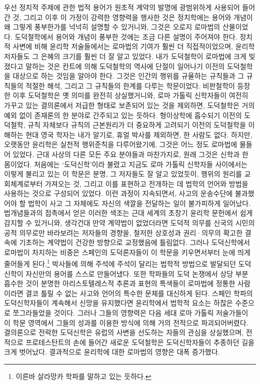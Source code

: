 우선
정치적 주제에 관한 법적 용어가
원초적 계약의 발명에
광범위하게 사용되어 들어간 것, 그리고
이후 이 가정이 강력한 영향력을 행사한 것은
정치학에는
용어와 개념이
왜 그렇게 풍부한가를 넉넉히 설명할 수 있거니와,
그것은 오로지 로마법의 산물이었다.
도덕철학에서 용어와 개념이 풍부한 것에는
조금 다른 설명이 주어져야 한다.
정치적 사변에 비해
윤리학 저술들에서는 로마법의 기여가
훨씬 더 직접적이었으며,
윤리학 저자들도
그 은혜의 크기를 훨씬 더 잘 알고 있었다.
내가 도덕철학이 로마법에 크게 빚졌다고 말하는 것은
칸트에 의해 도덕철학의 역사에 단절이 일어나기 이전의
도덕철학을 대상으로 하는 것임을 알아야 한다.
그것은 인간의 행위를 규율하는 규칙들과
그 규칙들의 적절한 해석,
그리고 그 규칙들의 한계를
다루는 학문이었다.
비판철학이 등장한 이후
도덕철학은 옛 의미를 완전히 상실했거니와,
로마 가톨릭 신학자들이 여전히 가꾸고 있는
결의론에서
저급한 형태로 보존되어 있는 것을 제외하면,
도덕철학은 거의 예외 없이 존재론의 한 분야로 간주되고 있는 듯하다.
형이상학에 흡수되기 이전의 도덕철학,
규칙 자체보다 규칙의 근본원리가 더 중요하게 고려되기 이전의 도덕철학을
이해하는
현대 영국 학자는
내가 알기로,
휴얼 박사를 제외하면,
한 사람도 없다.
하지만,
오랫동안
윤리학은
실천적 행위준칙을 다루어왔기에,
그것은 어느 정도 로마법에 물들어 있었다.
근대 사상의 다른 모든 주요 분야들과 마찬가지로,
원래
그것은
신학과 한 몸이었다.
처음에는 `도덕신학'이라 불렸고
지금도 로마 가톨릭 신학자들 사이에서는 이렇게 불리고 있는
이 학문은 분명, 그 저자들도 잘 알고 있었듯이,
행위의 원리를
교회체계로부터
가져오는 것, 그리고
이를 표현하고 전개하는 데 법학의 언어와 방법을 사용하는 것으로
구성되어 있었다.
이런 과정이 지속되면서,
사고의 운송수단에 불과했어야 할 법학이
사고 그 자체에도 자신의 색깔을 전달하는 일이 불가피하게 일어났다.
법개념들과의 접촉에서 얻은 이러한 색조는
근대 세계의 초창기 윤리학 문헌에서 쉽게 감지할 수 있거니와,
생각건대
만약 계약법이 없었더라면
도덕적 의무를
신국의 시민의 공적 의무로만
바라보려는
저자들의
경향을,
철저한 상호성과 권리^^b7의무의 확고한 결속에 기초하는 계약법이
건강한 방향으로 교정했음에
틀림없다.
그러나 도덕신학에서 로마법이 차지하는 비중은
스페인의 도덕론자들이 이 학문을 키우면서부터
눈에 띄게 줄어들게 된다.\footnote{%
  이른바 살라망카 학파를 말하고 있는 듯하다.
  }
박사들에 의해 주석에 주석이 달리는 법학적 방법으로 발달되던
도덕신학이 자신만의 용어를 스스로 만들어냈다.
또한
학파들의 도덕 논쟁에서 상당 부분 흡수한 것이 분명한
아리스토텔레스적 추론과 표현의 특색들이
로마법에 정통한 사람이라면 결코 틀릴 수 없는
사고와 언어의 특수한 문체를 대신하게 된다.
스페인 학파의 도덕신학자들이 계속해서 신망을 유지했다면
윤리학에서 법학적 요소는 하찮은 수준으로 쪼그라들었을 것이다.
그러나
그들의 영향력은
다음 세대 로마 가톨릭 저술가들이
이 학문 영역에서
그들의 성과를 이용한 방식에 의해
거의 전적으로 파괴되어버렸다.
결의론으로 전락한
도덕신학은
유럽의 사변을 선도하는 자들의
관심을 상실했으며,
전적으로 프로테스탄트의 손에 들어간
새로운 도덕철학은
도덕신학자들이 추종하던 길을 크게 벗어났다.
결과적으로 윤리학에 대한 로마법의 영향은 대폭 증가했다.


